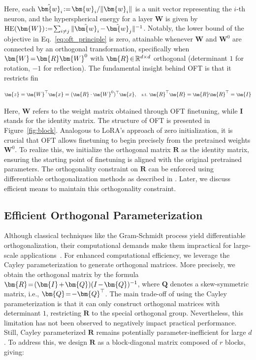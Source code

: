 Here, each $\thickmuskip=2mu \medmuskip=2mu \hat{\bm{w}}_i:=\bm{w}_i/\|\bm{w}_i\|$ is a unit vector representing the $i$-th neuron, and the hyperspherical energy for a layer $\bm{W}$ is given by $\thickmuskip=2mu \medmuskip=2mu \text{HE}(\bm{W}):= \sum_{i\neq j} \|\hat{\bm{w}}_i-\hat{\bm{w}}_j\|^{-1}$. Notably, the lower bound of the objective in Eq.~\eqref{eq:oft_principle} is zero, attainable whenever $\bm{W}$ and $\bm{W}^0$ are connected by an orthogonal transformation, specifically when $\thickmuskip=2mu \medmuskip=2mu \bm{W}=\bm{R}\bm{W}^0$ with $\thickmuskip=2mu \medmuskip=2mu \bm{R}\in\mathbb{R}^{d\times d}$ orthogonal (determinant $1$ for rotation, $-1$ for reflection). The fundamental insight behind OFT is that it restricts fin

\begin{equation}\label{eq:oft_general}
    \footnotesize
    \bm{z}=\bm{W}^\top\bm{x}=(\bm{R}\cdot\bm{W}^0)^\top\bm{x},~~~\text{s.t.}~\bm{R}^\top\bm{R}=\bm{R}\bm{R}^\top=\bm{I}
\end{equation}

Here, $\bm{W}$ refers to the weight matrix obtained through OFT finetuning, while $\bm{I}$ stands for the identity matrix. The structure of OFT is presented in Figure~\ref{fig:block}. Analogous to LoRA's approach of zero initialization, it is crucial that OFT allows finetuning to begin precisely from the pretrained weights $\bm{W}^0$. To realize this, we initialize the orthogonal matrix $\bm{R}$ as the identity matrix, ensuring the starting point of finetuning is aligned with the original pretrained parameters. The orthogonality constraint on $\bm{R}$ can be enforced using differentiable orthogonalization methods as described in \cite{liu2021orthogonal,lezcano2019cheap}. Later, we discuss efficient means to maintain this orthogonality constraint.

\subsection{Efficient Orthogonal Parameterization}\label{sect:eff_ortho}

Although classical techniques like the Gram-Schmidt process yield differentiable orthogonalization, their computational demands make them impractical for large-scale applications~\cite{liu2021orthogonal}. For enhanced computational efficiency, we leverage the Cayley parameterization to generate orthogonal matrices. More precisely, we obtain the orthogonal matrix by the formula $\thickmuskip=2mu \medmuskip=2mu \bm{R}=(\bm{I}+\bm{Q})(I-\bm{Q})^{-1}$, where $\bm{Q}$ denotes a skew-symmetric matrix, i.e., $\thickmuskip=2mu \medmuskip=2mu \bm{Q}=-\bm{Q}^\top$. The main trade-off of using the Cayley parameterization is that it can only construct orthogonal matrices with determinant $1$, restricting $\bm{R}$ to the special orthogonal group. Nevertheless, this limitation has not been observed to negatively impact practical performance. Still, Cayley parameterized $\bm{R}$ remains potentially parameter-inefficient for large $d$. To address this, we design $\bm{R}$ as a block-diagonal matrix composed of $r$ blocks, giving:

